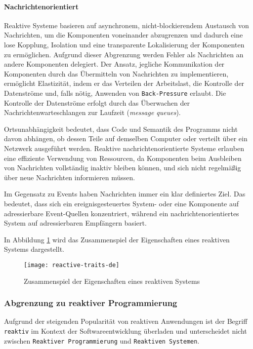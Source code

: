 \paragraph{Nachrichtenorientiert}Reaktive Systeme basieren auf asynchronem,
nicht-blockierendem Austausch von Nachrichten, um die Komponenten voneinander
abzugrenzen und dadurch eine lose Kopplung, Isolation und eine transparente Lokalisierung der Komponenten zu ermöglichen.
Aufgrund dieser Abgrenzung werden Fehler als Nachrichten an andere Komponenten delegiert.
Der Ansatz, jegliche Kommunikation der Komponenten durch das Übermitteln von Nachrichten zu implementieren, ermöglicht Elastizität,
indem er das Verteilen der Arbeitslast, die Kontrolle der Datenströme und, falls nötig, Anwenden von \verb|Back-Pressure| erlaubt.
Die Kontrolle der Datenströme erfolgt durch das Überwachen der Nachrichtenwarteschlangen zur Laufzeit (\textit{message queues}).

Ortsunabhängigkeit bedeutet, dass Code und Semantik des Programms nicht davon abhängen, ob dessen Teile auf demselben Computer
oder verteilt über ein Netzwerk ausgeführt werden.
Reaktive nachrichtenorientierte Systeme erlauben eine effiziente Verwendung von Ressourcen, da Komponenten beim Ausbleiben von
Nachrichten vollständig inaktiv bleiben können, und sich nicht regelmäßig über neue Nachrichten informieren müssen.\parencite{ReactiveSystems}

Im Gegensatz zu Events haben Nachrichten immer ein klar definiertes Ziel.
Das bedeutet, dass sich ein ereignisgesteuertes System- oder eine Komponente auf adressierbare Event-Quellen konzentriert,
während ein nachrichtenorientiertes System auf adressierbaren Empfängern basiert.

In Abbildung \ref{fig:reactive-traits} wird das Zusammenspiel der Eigenschaften eines reaktiven Systems dargestellt.

\begin{figure}[ht!]
  \centering
  \texttt{[image: reactive-traits-de]}
  \caption{Zusammenspiel der Eigenschaften eines reaktiven Systems \parencite{ReactiveSystems}}
  \label{fig:reactive-traits}
\end{figure}
\newpage
\subsubsection{Abgrenzung zu reaktiver Programmierung}
\label{subsubsection:abgrenzung_reaktive_programmierung}
Aufgrund der steigenden Popularität von reaktiven Anwendungen ist der Begriff \verb|reaktiv| im Kontext der Softwareentwicklung
überladen und unterscheidet nicht zwischen \newline\verb|Reaktiver Programmierung| und \verb|Reaktiven Systemen|.


